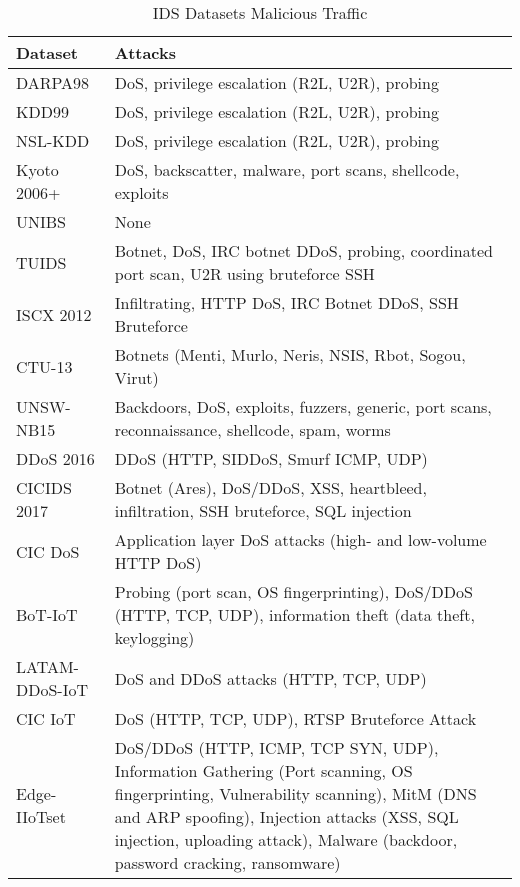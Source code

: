 \documentclass[lettersize,journal]{IEEEtran}
\begin{document}
\begin{table}[t]
    \centering
    \caption{IDS Datasets Malicious Traffic}
    \label{tab:dataset_attacks}
    \begin{tabularx}{\columnwidth}{@{}>{\raggedright\arraybackslash}p{2.5cm}X}
        \toprule
        \textbf{Dataset} & \textbf{Attacks} \\
        \midrule
        DARPA98 & DoS, privilege escalation (R2L, U2R), probing \\
        \midrule
        KDD99 & DoS, privilege escalation (R2L, U2R), probing \\
        \midrule
        NSL-KDD & DoS, privilege escalation (R2L, U2R), probing \\
        \midrule
        Kyoto 2006+ & DoS, backscatter, malware, port scans, shellcode, exploits \\
        \midrule
        UNIBS & None \\
        \midrule
        TUIDS & Botnet, DoS, IRC botnet DDoS, probing, coordinated port scan, U2R using bruteforce SSH \\
        \midrule
        ISCX 2012 & Infiltrating, HTTP DoS, IRC Botnet DDoS, SSH Bruteforce \\
        \midrule
        CTU-13 & Botnets (Menti, Murlo, Neris, NSIS, Rbot, Sogou, Virut) \\
        \midrule
        UNSW-NB15 & Backdoors, DoS, exploits, fuzzers, generic, port scans, reconnaissance, shellcode, spam, worms \\
        \midrule
        DDoS 2016 & DDoS (HTTP, SIDDoS, Smurf \ac{ICMP}, UDP) \\
        \midrule
        CICIDS 2017 & Botnet (Ares), DoS/DDoS, XSS, heartbleed, infiltration, SSH bruteforce, SQL injection \\
        \midrule
        CIC DoS & Application layer DoS attacks (high- and low-volume HTTP DoS) \\
        \midrule
        BoT-IoT & Probing (port scan, OS fingerprinting), DoS/DDoS (HTTP, TCP, UDP), information theft (data theft, keylogging) \\
        \midrule
        LATAM-DDoS-IoT & DoS and DDoS attacks (HTTP, TCP, UDP) \\
        \midrule
        CIC IoT & DoS (HTTP, TCP, UDP), RTSP Bruteforce Attack \\
        \midrule
        Edge-IIoTset & DoS/DDoS (HTTP, ICMP, TCP SYN, UDP), Information Gathering (Port scanning, OS fingerprinting, Vulnerability scanning), MitM (\ac{DNS} and ARP spoofing), Injection attacks (XSS, SQL injection, uploading attack), Malware (backdoor, password cracking, ransomware)\\

\end{tabularx}
\end{table}
\end{document}
